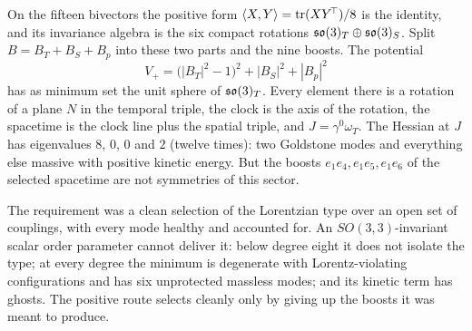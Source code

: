 \begin{proposition}
\label{prop:positivealt}
On the fifteen bivectors the positive form $\langle X,Y\rangle=\operatorname{tr}(XY^{\!\top})/8$ is the identity, and its invariance algebra is the six compact rotations $\mathfrak{so}(3)_T\oplus\mathfrak{so}(3)_S$.
Split $B=B_T+B_S+B_p$ into these two parts and the nine boosts. The potential
\[
V_+=\bigl(|B_T|^2-1\bigr)^2+|B_S|^2+|B_p|^2
\]
has as minimum set the unit sphere of $\mathfrak{so}(3)_T$. Every element there is a rotation of a plane $N$ in the temporal triple, the clock is the axis of the rotation, the spacetime is the
clock line plus the spatial triple, and $J=\gamma^0\omega_T$. The Hessian at $J$ has eigenvalues $8$, $0$, $0$ and $2$ (twelve times): two Goldstone modes and everything else massive
with positive kinetic energy. But the boosts $e_1e_4,e_1e_5,e_1e_6$ of the selected spacetime are not symmetries of this sector.
\end{proposition}

The requirement was a clean selection of the Lorentzian type over an open set of couplings, with every mode healthy and accounted for. An $SO(3,3)$-invariant scalar
order parameter cannot deliver it: below degree eight it does not isolate the type; at every degree the minimum is degenerate with Lorentz-violating configurations and has
six unprotected massless modes; and its kinetic term has ghosts. The positive route selects cleanly only by giving up the boosts it was meant to produce.
